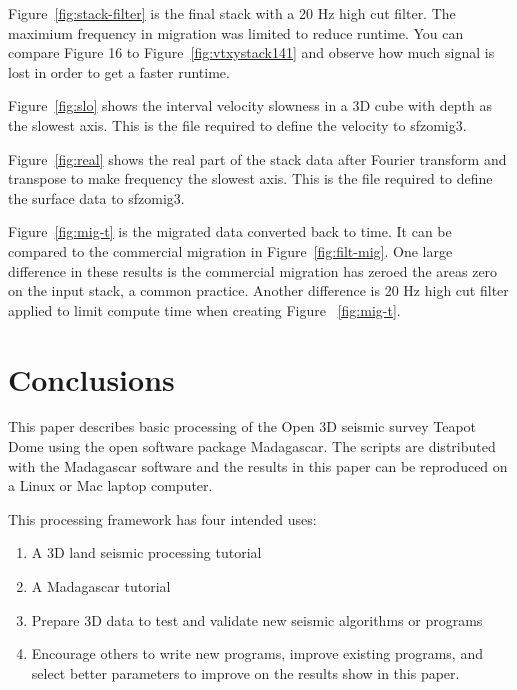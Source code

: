 Figure~\ref{fig:stack-filter} is the final stack with a 20 Hz high cut filter.  The maximium frequency in migration was limited to reduce runtime.  You can compare Figure 16 to Figure~\ref{fig:vtxystack141} and observe how much signal is lost in order to get a faster runtime.

Figure~\ref{fig:slo} shows the interval velocity slowness in a 3D cube with depth as the slowest axis.  This is the file required to define the velocity to sfzomig3.

Figure~\ref{fig:real} shows the real part of the stack data after Fourier transform and transpose to make frequency the slowest axis.  This is the file required to define the surface data to sfzomig3.

Figure~\ref{fig:mig-t} is the migrated data converted back to time.  It can be compared to the commercial migration in Figure~\ref{fig:filt-mig}.  One large difference in these results is the commercial migration has zeroed the areas zero on the input stack, a common practice.  Another difference is 20 Hz high cut filter applied to limit compute time when creating Figure ~\ref{fig:mig-t}.  






\section{Conclusions}
This paper describes basic processing of the Open 3D seismic survey Teapot Dome using the open software package Madagascar.   The scripts are distributed with the Madagascar software and the results in this paper can be reproduced on a Linux or Mac laptop computer.  

This processing framework has four intended uses:
\begin{enumerate}
\item A 3D land seismic processing tutorial
\item A Madagascar tutorial
\item Prepare 3D data to test and validate new seismic algorithms or programs
\item Encourage others to write new programs, improve existing programs, and select better parameters to improve on the results show in this paper.
\end{enumerate}

